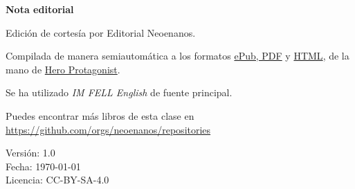\begin{center}
  {\LARGE\textbf{Nota editorial}}
\end{center}

\bigskip

Edición de cortesía por Editorial Neoenanos.

\medskip

Compilada de manera semiautomática a los formatos \href{https://github.com/neoenanos/elella/releases}{ePub, PDF} y \href{https://elella.netlify.app}{HTML}, de la mano de \href{https://heroprotagonist.is-a.dev/}{Hero Protagonist}.

\medskip

Se ha utilizado {\it IM FELL English} de fuente principal.

\medskip

Puedes encontrar más libros de esta clase en\\
\url{https://github.com/orgs/neoenanos/repositories}

\medskip

Versión: 1.0\\
Fecha: \today\\
Licencia: CC-BY-SA-4.0

\bigskip

